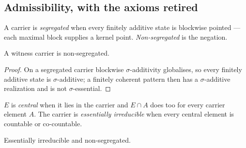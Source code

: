 \subsection{Admissibility, with the axioms retired}

\begin{definition}
  \label{def:segregated}
  \leanok
  A carrier is \emph{segregated} when every finitely additive state is blockwise
  pointed --- each maximal block supplies a kernel point. \emph{Non-segregated}
  is the negation.
\end{definition}

\begin{lemma}
  \label{lem:witness-nonsegregated}
  \leanok
  A witness carrier is non-segregated.
\end{lemma}

\begin{proof}
  \leanok
  On a segregated carrier blockwise $\sigma$-additivity globalises, so every
  finitely additive state is $\sigma$-additive; a finitely coherent pattern then
  has a $\sigma$-additive realization and is not $\sigma$-essential.
\end{proof}

\begin{definition}
  \label{def:essentially-irreducible}
  \leanok
  $E$ is \emph{central} when it lies in the carrier and $E \cap A$ does too for
  every carrier element $A$. The carrier is \emph{essentially irreducible} when
  every central element is countable or co-countable.
\end{definition}

\begin{definition}
  \label{def:admissible}
  \leanok
  Essentially irreducible and non-segregated.
\end{definition}

